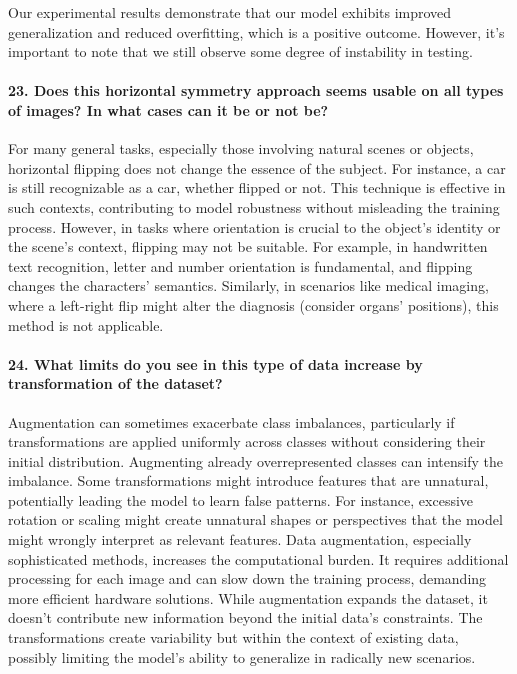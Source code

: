 Our experimental results demonstrate that our model exhibits improved generalization and reduced overfitting, which is a positive outcome. However, it's important to note that we still observe some degree of instability in testing.

\paragraph{23. Does this horizontal symmetry approach seems usable on all types of images? In what cases can it be or not be?}
For many general tasks, especially those involving natural scenes or objects, horizontal flipping does not change the essence of the subject. For instance, a car is still recognizable as a car, whether flipped or not. This technique is effective in such contexts, contributing to model robustness without misleading the training process. However, in tasks where orientation is crucial to the object's identity or the scene's context, flipping may not be suitable. For example, in handwritten text recognition, letter and number orientation is fundamental, and flipping changes the characters' semantics. Similarly, in scenarios like medical imaging, where a left-right flip might alter the diagnosis (consider organs' positions), this method is not applicable.

\paragraph{24. What limits do you see in this type of data increase by transformation of the dataset?}
Augmentation can sometimes exacerbate class imbalances, particularly if transformations are applied uniformly across classes without considering their initial distribution. Augmenting already overrepresented classes can intensify the imbalance. Some transformations might introduce features that are unnatural, potentially leading the model to learn false patterns. For instance, excessive rotation or scaling might create unnatural shapes or perspectives that the model might wrongly interpret as relevant features. Data augmentation, especially sophisticated methods, increases the computational burden. It requires additional processing for each image and can slow down the training process, demanding more efficient hardware solutions. While augmentation expands the dataset, it doesn't contribute new information beyond the initial data's constraints. The transformations create variability but within the context of existing data, possibly limiting the model's ability to generalize in radically new scenarios.

